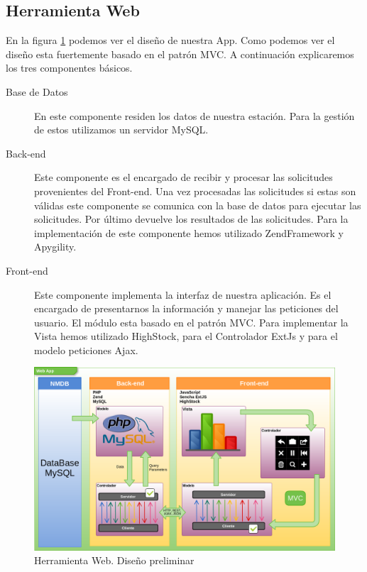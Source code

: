 	\subsection{Herramienta Web}
		En la figura \ref{fig:herramienta_web_preliminar} podemos ver el diseño de nuestra App. Como podemos ver el diseño esta fuertemente basado en el patrón MVC. A continuación 
		explicaremos los tres componentes básicos. 
		\begin{description}
			\item[Base de Datos]    En este componente residen los datos de nuestra estación. Para la gestión de estos utilizamos un servidor MySQL.
			\item[Back-end]    	Este componente es el encargado de recibir y procesar las solicitudes provenientes del Front-end. Una vez procesadas
			  			las solicitudes si estas son válidas este componente se comunica con la base de datos para ejecutar las solicitudes. 
						Por último devuelve los resultados de las solicitudes. Para la implementación de este componente hemos utilizado
						ZendFramework y Apygility.  
			\item[Front-end]    	Este componente implementa la interfaz de nuestra aplicación. Es el encargado de presentarnos la información y
			  			manejar las peticiones del usuario. El módulo esta basado en el patrón MVC. Para implementar la Vista hemos
						utilizado HighStock, para el Controlador ExtJs y para el modelo peticiones Ajax.
		\end{description}
		\begin{figure}[h]
			\centering
			\includegraphics[keepaspectratio, width=1\textwidth]{./img/herramienta_web_preliminar.png}
			\caption{Herramienta Web. Diseño preliminar}
			\label{fig:herramienta_web_preliminar}
		\end{figure}
